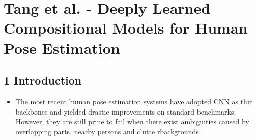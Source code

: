 \documentclass{report}
\begin{document}
\section*{Tang et al. - Deeply Learned Compositional Models for Human Pose Estimation}
\subsection*{1 Introduction}
\begin{itemize}
    \item The most recent human pose estimation systems have adopted CNN as thir backbones and yielded drastic improvements on standard benchmarks. However, they are still prine to fail when there exist ambiguities caused by overlapping parts, nearby persons and clutte rbackgrounds.
\end{itemize}
\end{document}

